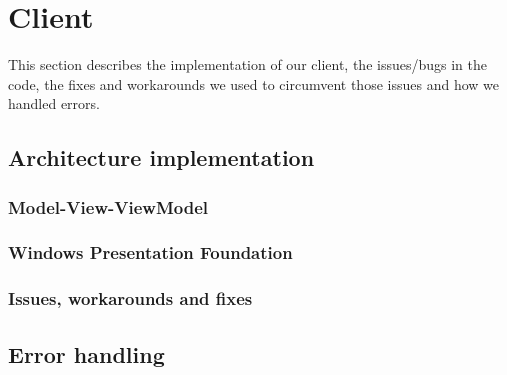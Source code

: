 \section{Client}
\label{Implementation_Client}
This section describes the implementation of our client, the issues/bugs in the code, the fixes and workarounds we used to circumvent those issues and how we handled errors.
\subsection{Architecture implementation}
\label{Implementation_Client_Architecture}

\subsubsection{Model-View-ViewModel}
\label{Implementation_Client_Architecture_MVVM}

\subsubsection{Windows Presentation Foundation}
\label{Implementation_Client_Architecture_WPF}

\subsubsection{Issues, workarounds and fixes}
\label{Implementation_Client_Architecture_Issues}

\subsection{Error handling}
\label{Implementation_Client_Error}